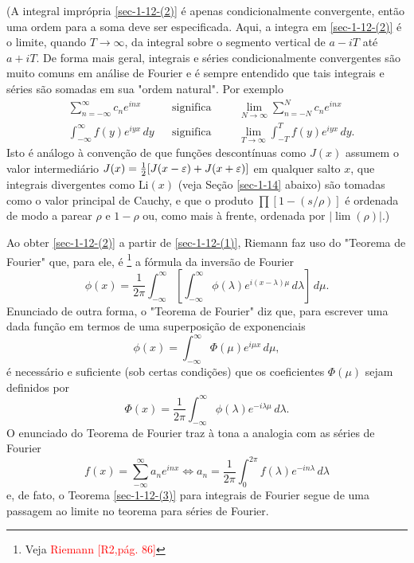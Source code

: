     (A integral imprópria \eqref{sec-1-12-(2)} é apenas condicionalmente convergente, então uma ordem para a soma deve ser especificada. Aqui, a integra em \eqref{sec-1-12-(2)} é o limite, quando $T \to \infty$, da integral sobre o segmento vertical de $a - iT$ até $a + iT$. De forma mais geral, integrais e séries condicionalmente convergentes são muito comuns em análise de Fourier e é sempre entendido que tais integrais e séries são somadas em sua "ordem natural". Por exemplo
    \begin{align*}
        &\sum_{n=-\infty}^{\infty} c_n e^{inx} &&\text{significa} &&&\lim_{N \to \infty} \sum_{n=-N}^{N} c_n e^{inx} \\
        &\int_{-\infty}^{\infty} f(y)e^{iyx} \, dy &&\text{significa} &&&\lim_{T \to \infty} \int_{-T}^{T} f(y)e^{iyx} \, dy.
    \end{align*}
    Isto é análogo à convenção de que funções descontínuas como $J(x)$ assumem o valor intermediário $J(x) = \frac{1}{2}[J(x-\varepsilon) + J(x+\varepsilon)]$ em qualquer salto $x$, que integrais divergentes como $\text{Li}(x)$ (veja Seção \ref{sec-1-14} abaixo) são tomadas como o valor principal de Cauchy, e que o produto $\prod [1 - (s/\rho)]$ é ordenada de modo a parear $\rho$ e $1 - \rho$ ou, como mais à frente, ordenada por $|\lim (\rho)|$.)
    
    Ao obter \eqref{sec-1-12-(2)} a partir de \eqref{sec-1-12-(1)}, Riemann faz uso do "Teorema de Fourier" que, para ele, é
    \footnote{Veja \textcolor{red}{Riemann [R2,pág. 86]}}
    a fórmula da inversão de Fourier
    \begin{equation}
        \label{sec-1-12-(3)} 
        \phi(x) = \frac{1}{2\pi} \int_{-\infty}^{\infty} \left[ \int_{-\infty}^{\infty} \phi(\lambda) e^{i(x-\lambda) \mu} \, d\lambda \right] \, d\mu.
    \end{equation}
    Enunciado de outra forma, o "Teorema de Fourier" diz que, para escrever uma dada função em termos de uma superposição de exponenciais
    \begin{equation*}
        \phi(x) =  \int_{-\infty}^{\infty}  \Phi(\mu) e^{i\mu x} \, d\mu,
    \end{equation*}
    é necessário e suficiente (sob certas condições) que os coeficientes $\Phi(\mu)$ sejam definidos por
    \begin{equation*}
        \Phi(x) =  \frac{1}{2\pi} \int_{-\infty}^{\infty}  \phi(\lambda) e^{-i\lambda \mu} \, d\lambda.
    \end{equation*}
    O enunciado do Teorema de Fourier traz à tona a analogia com as séries de Fourier
    \begin{equation*}
        f(x) = \sum_{-\infty}^{\infty} a_n e^{inx}  \Longleftrightarrow a_n = \frac{1}{2\pi} \int_{0}^{2\pi}  f(\lambda) e^{-in\lambda} \, d\lambda
    \end{equation*}
    e, de fato, o Teorema \eqref{sec-1-12-(3)} para integrais de Fourier segue de uma passagem ao limite no teorema para séries de Fourier.
    
